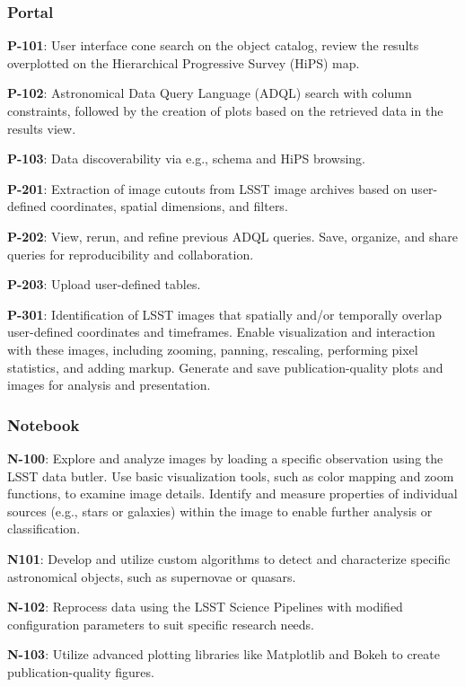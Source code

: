 
\subsubsection{Portal}

\textbf{P-101}: User interface cone search on the object catalog, review the results overplotted on the Hierarchical Progressive Survey (HiPS) map.

\textbf{P-102}: Astronomical Data Query Language (ADQL) search with column constraints, followed by the creation of plots based on the retrieved data in the results view.

\textbf{P-103}: Data discoverability via e.g., schema and HiPS browsing. 

\textbf{P-201}: Extraction of image cutouts from LSST image archives based on user-defined coordinates, spatial dimensions, and filters.

\textbf{P-202}:  View, rerun, and refine previous ADQL queries. Save, organize, and share queries for reproducibility and collaboration.

\textbf{P-203}: Upload user-defined tables.

\textbf{P-301}: Identification of LSST images that spatially and/or temporally overlap user-defined coordinates and timeframes. Enable visualization and interaction with these images, including zooming, panning, rescaling, performing pixel statistics, and adding markup. Generate and save publication-quality plots and images for analysis and presentation.

\subsubsection{Notebook}

\textbf{N-100}: Explore and analyze images by loading a specific observation using the LSST data butler. Use basic visualization tools, such as color mapping and zoom functions, to examine image details. Identify and measure properties of individual sources (e.g., stars or galaxies) within the image to enable further analysis or classification.

\textbf{N101}: Develop and utilize custom algorithms to detect and characterize specific astronomical objects, such as supernovae or quasars.

\textbf{N-102}: Reprocess data using the LSST Science Pipelines with modified configuration parameters to suit specific research needs.

\textbf{N-103}: Utilize advanced plotting libraries like Matplotlib and Bokeh to create publication-quality figures.

